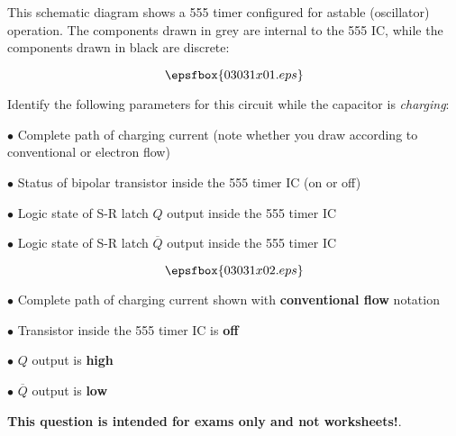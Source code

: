 

This schematic diagram shows a 555 timer configured for astable (oscillator) operation.  The components drawn in grey are internal to the 555 IC, while the components drawn in black are discrete:

$$\epsfbox{03031x01.eps}$$

Identify the following parameters for this circuit while the capacitor is {\it charging}:

\medskip
\item{$\bullet$} Complete path of charging current (note whether you draw according to conventional or electron flow)
\item{$\bullet$} Status of bipolar transistor inside the 555 timer IC (on or off)
\item{$\bullet$} Logic state of S-R latch $Q$ output inside the 555 timer IC
\item{$\bullet$} Logic state of S-R latch $\overline{Q}$ output inside the 555 timer IC
\medskip







$$\epsfbox{03031x02.eps}$$

\medskip
\item{$\bullet$} Complete path of charging current shown with {\bf conventional flow} notation
\item{$\bullet$} Transistor inside the 555 timer IC is {\bf off}
\item{$\bullet$} $Q$ output is {\bf high}
\item{$\bullet$} $\overline{Q}$ output is {\bf low}
\medskip







{\bf This question is intended for exams only and not worksheets!}.




